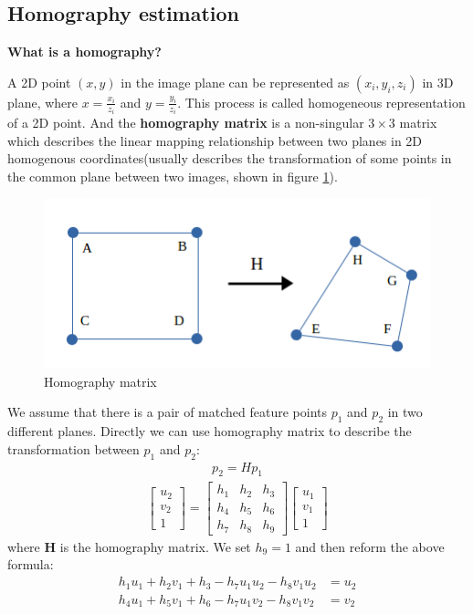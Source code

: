 \subsection{Homography estimation}
\textbf{What is a homography?} 

A 2D point $(x,y)$ in the image plane can be represented as $(x_i,y_i,z_i)$ in 3D plane, where $x = \frac{x_i}{z_i}$ and $y = \frac{y_i}{z_i}$. This process is called homogeneous
representation of a 2D point. And the \textbf{homography matrix} is a non-singular $3 \times 3$ matrix which describes the linear mapping relationship between two planes in 2D homogenous coordinates(usually describes the transformation of some points in the common plane between two images, shown in figure \ref{fig:homo_es}). 

\begin{figure}[h]
\centering
\includegraphics[scale=0.5]{./fig/homo_es.png}
\caption{Homography matrix}  
\label{fig:homo_es}
\end{figure}

We assume that there is a pair of matched feature points $p_1$ and $p_2$ in two different planes. Directly we can use homography matrix to describe the transformation between $p_1$ and $p_2$:
\begin{align*}
 p_2 = Hp_1  
\end{align*}
\begin{align*}
\begin{bmatrix} u_2 \\ v_2 \\ 1  \end{bmatrix}
=
\begin{bmatrix} h_1 & h_2 & h_3 \\
                h_4 & h_5 & h_6 \\
                h_7 & h_8 & h_9 \end{bmatrix}
\begin{bmatrix} u_1 \\ v_1 \\ 1  \end{bmatrix}
\end{align*}
where \textbf{H} is the homography matrix. We set $h_9 = 1$ and then reform the above formula:
\begin{align*}
h_1u_1 + h_2v_1 + h_3 - h_7u_1u_2 - h_8v_1u_2 &= u_2 \\
h_4u_1 + h_5v_1 + h_6 - h_7u_1v_2 - h_8v_1v_2 &= v_2 
\end{align*}

